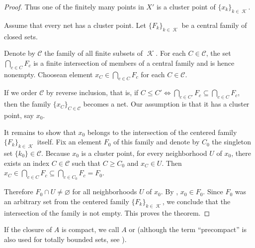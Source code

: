 \begin{proof}
  Thus one of the finitely many points in \( X' \) is a cluster point of \( \{ x_k \}_{k \in \mscrK} \).

   Assume that every net has a cluster point. Let \( \{ F_k \}_{k \in \mscrK} \) be a central family of closed sets.

  Denote by \( \mathcal C \) the family of all finite subsets of \( \mscrK \). For each \( C \in \mathcal C \), the set \( \bigcap_{c \in C} F_c \) is a finite intersection of members of a central family and is hence nonempty. Choose\AOC an element \( x_C \in \bigcap_{c \in C} F_c \) for each \( C \in \mathcal C \).

  If we order \( \mathcal C \) by reverse inclusion, that is, if \( C \leq C' \iff \bigcap_{c \in C'} F_c \subseteq \bigcap_{c \in C} F_c \), then the family \( \{ x_C \}_{C \in \mathcal C} \) becomes a net. Our assumption is that it has a cluster point, say \( x_0 \).

  It remains to show that \( x_0 \) belongs to the intersection of the centered family \( \{ F_k \}_{k \in \mscrK} \) itself. Fix an element \( F_0 \) of this family and denote by \( C_0 \) the singleton set \( \{ k_0 \} \in \mathcal C \). Because \( x_0 \) is a cluster point, for every neighborhood \( U \) of \( x_0 \), there exists an index \( C \in \mathcal C \) such that \( C \geq C_0 \) and \( x_C \in U \). Then \( x_C \in \bigcap_{c \in C} F_c \subseteq \bigcap_{c \in C_0} F_c = F_0 \).

  Therefore \( F_0 \cap U \neq \varnothing \) for all neighborhoods \( U \) of \( x_0 \). By , \( x_0 \in F_0 \). Since \( F_0 \) was an arbitrary set from the centered family \( \{ F_k \}_{k \in \mscrK} \), we conclude that the intersection of the family is not empty. This proves the theorem.
\end{proof}

\begin{remark}\label{rem:precompact_set}
  If the closure of \( A \) is compact, we call \( A \)  or  (although the term \enquote{precompact} is also used for totally bounded sets, see ).
\end{remark}

